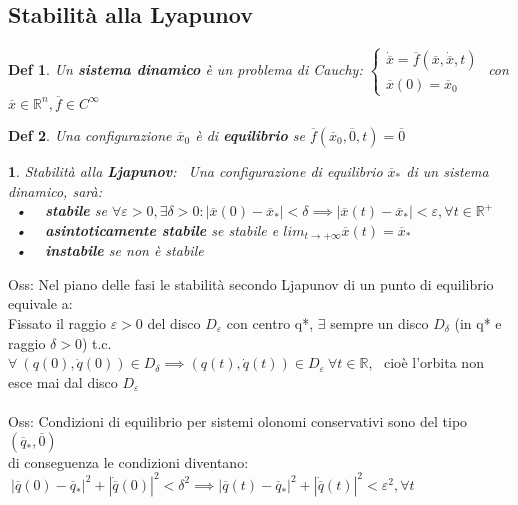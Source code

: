 \documentclass{article}
\theoremstyle{unnumbered}
\newtheorem* {theoremT}{Def}
\theoremstyle{unnumbered1}
\newtheorem* {theoremT1}{}
\newenvironment{defi}{\begin{gBox}\begin{theoremT}}{\end{theoremT}\end{gBox}}
\newenvironment{Ndefi}{\begin{gBox}\begin{theoremT1}}{\end{theoremT1}\end{gBox}}
\begin{document}
\subsection{Stabilità alla Lyapunov}
%
\begin{defi}
Un \textbf{sistema dinamico} è un problema di Cauchy: $\begin{cases} \dot{\overline{x}}=\overline{f}(\overline{x},\dot{\overline{x}},t)\\ \overline{x}(0)=\overline{x}_0 \end{cases}$  con $\overline{x}\in\mathbb{R}^n, \overline{f} \in C^{\infty} $
\end{defi}
%
\begin{defi}
Una configurazione $\overline{x}_0$ è di \textbf{equilibrio} se $\overline{f}(\overline{x}_0,\overline{0},t)=\overline{0}$
\end{defi}
%
%
%
\begin{Ndefi}
Stabilità alla \textbf{Ljapunov}: \ Una configurazione di equilibrio $\overline{x}_*$ di un sistema dinamico, sarà:\\
\ • \ \ \textbf{stabile} se $\forall \varepsilon>0, \exists\delta>0 : |\overline{x}(0)-\overline{x}_*|<\delta \implies |\overline{x}(t)-\overline{x}_*|<\varepsilon, \forall t\in \mathbb{R}^+$ \\
\ • \ \ \textbf{asintoticamente stabile} se stabile e $lim_{t\rightarrow +\infty} \overline{x}(t)=\overline{x}_*$\\
\ • \ \ \textbf{instabile} se non è stabile
\end{Ndefi}
%
Oss: Nel piano delle fasi le stabilità secondo Ljapunov di un punto di equilibrio equivale a:\\
\phantom{Oss: }Fissato il raggio $\varepsilon>0$ del disco $D_{\varepsilon}$ con centro q*, $\exists$ sempre un disco $D_{\delta}$ (in q* e raggio $\delta>0$) t.c. \\
\phantom{Oss: }$\forall \ (q(0),\dot{q}(0))\in D_{\delta} \implies (q(t),\dot{q}(t))\in D_{\varepsilon} \ \forall t \in \mathbb{R}$, \ cioè l'orbita non esce mai dal disco $D_{\varepsilon}$ \\ \\
%
%
%
Oss: Condizioni di equilibrio per sistemi olonomi conservativi sono del tipo $(\overline{q}_*,\overline{0})$\\
%
\phantom{Oss: }di conseguenza le condizioni diventano: $\ |\overline{q}(0)-\overline{q}_*|^2 + |\dot{\overline{q}}(0)|^2<\delta^2 \implies |\overline{q}(t)-\overline{q}_*|^2+|\dot{\overline{q}}(t)|^2<\varepsilon^2, \forall t \ $ \\
\end{document}
